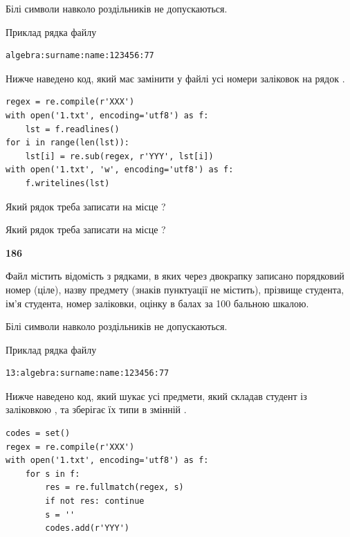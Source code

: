 Білі символи навколо роздільників не допускаються.

Приклад рядка файлу



\begin{verbatim}
algebra:surname:name:123456:77
\end{verbatim}


Нижче наведено код, який має замінити у файлі усі номери заліковок на рядок \code{***}.



\begin{verbatim}
regex = re.compile(r'XXX')
with open('1.txt', encoding='utf8') as f:
    lst = f.readlines()
for i in range(len(lst)):
    lst[i] = re.sub(regex, r'YYY', lst[i])
with open('1.txt', 'w', encoding='utf8') as f:
    f.writelines(lst)
\end{verbatim}







Який рядок треба записати на місце  ?\par
\vspace{5mm}


Який рядок треба записати на місце  ?\par


\newpage

{\begin {center}\textbf{ 186}\end {center}}\par
Файл  містить відомість з рядками, в яких через двокрапку записано поряд\-ковий номер (ціле), назву предмету (знаків пунктуації не містить), прізвище студента, ім'я студента, номер заліковки, оцінку в балах за 100 бальною шкалою.

Білі символи навколо роздільників не допускаються.

Приклад рядка файлу



\begin{verbatim}
13:algebra:surname:name:123456:77
\end{verbatim}


Нижче наведено код, який шукає усі предмети, який складав студент із заліковкою , та зберігає їх типи в змінній .



\begin{verbatim}
codes = set()
regex = re.compile(r'XXX')
with open('1.txt', encoding='utf8') as f:
    for s in f:
        res = re.fullmatch(regex, s)
        if not res: continue
        s = ''
        codes.add(r'YYY')
\end{verbatim}





